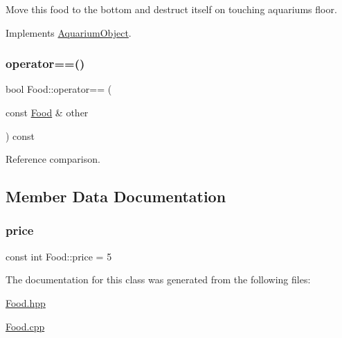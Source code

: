 Move this food to the bottom and destruct itself on touching aquarium\textquotesingle{}s floor. 



Implements \mbox{\hyperlink{class_aquarium_object_a42c4de640f89ac8aebc26b7618578575}{Aquarium\+Object}}.

\mbox{\label{class_food_a7199d2bd48ecae8ffbbf1be8a39c5311}} 
\subsubsection{\texorpdfstring{operator==()}{operator==()}}
{\footnotesize\ttfamily bool Food\+::operator== (\begin{DoxyParamCaption}\item[{const \mbox{\hyperlink{class_food}{Food}} \&}]{other }\end{DoxyParamCaption}) const}



Reference comparison. 



\subsection{Member Data Documentation}
\mbox{\label{class_food_af54f2090e84e95fcdc95f5c2d93386df}} 
\subsubsection{\texorpdfstring{price}{price}}
{\footnotesize\ttfamily const int Food\+::price = 5\hspace{0.3cm}{\ttfamily [static]}}



The documentation for this class was generated from the following files\+:\begin{DoxyCompactItemize}
\item 
\mbox{\hyperlink{_food_8hpp}{Food.\+hpp}}\item 
\mbox{\hyperlink{_food_8cpp}{Food.\+cpp}}\end{DoxyCompactItemize}
